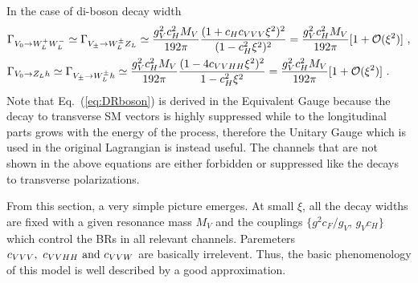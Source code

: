 \newline In the case of di-boson decay width
\begin{align}
  \label{eq:DRboson}
  &\Gamma_{V_{0}\rightarrow W_{L}^{+}W_{L}^{-}}\simeq\Gamma_{V_{\pm}\rightarrow W_{L}^{\pm}Z_{L}}\simeq\frac{g_{V}^{2}c_{H}^{2}M_{V}}{192\pi}\frac{(1+c_{H}c_{VVV}\xi^{2})^{2}}{(1-c_{H}^{2}\xi^{2})^{2}}=\frac{g_{V}^{2}c_{H}^{2}M_{V}}{192\pi}[1+\mathcal{O}(\xi^{2})]\textup{ ,}\nonumber\\
  &\Gamma_{V_{0}\rightarrow Z_{L}h}\simeq\Gamma_{V_{\pm}\rightarrow W_{L}^{\pm}h}\simeq\frac{g_{V}^{2}c_{H}^{2}M_{V}}{192\pi}\frac{(1-4c_{VVHH}\xi^{2})^{2}}{1-c_{H}^{2}\xi^{2}}=\frac{g_{V}^{2}c_{H}^{2}M_{V}}{192\pi}[1+\mathcal{O}(\xi^{2})]\textup{ .}\nonumber\\
\end{align}
Note that Eq.~(\ref{eq:DRboson}) is derived in the Equivalent Gauge\cite{EquivGauge} because the decay to transverse SM vectors is highly suppressed while to the longitudinal parts grows with the energy of the process, therefore the Unitary Gauge which is used in the original Lagrangian is instead useful. The channels that are not shown in the above equations are either forbidden or suppressed like the decays to transverse polarizations.

From this section, a very simple picture emerges. At small $\xi$, all the decay widths are fixed with a given resonance mass $M_{V}$ and the couplings $\{g^{2}c_{F}/g_{V}$, $g_{V}c_{H}\}$ which control the BRs in all relevant channels. Paremeters $c_{VVV},\textup{ } c_{VVHH}\textup{ and }c_{VVW}$ are basically irrelevent. Thus, the basic phenomenology of this model is well described by a good approximation.


\newpage
